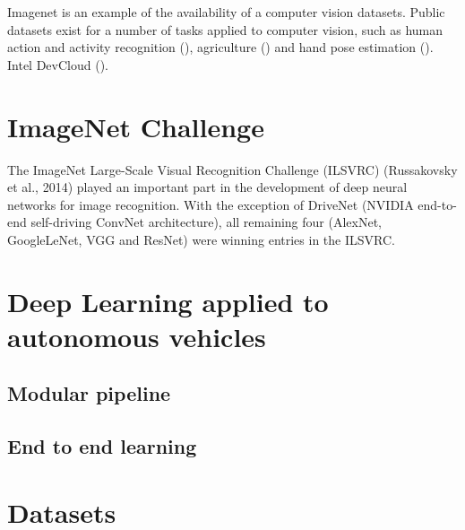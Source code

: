Imagenet is an example of the availability of a computer vision datasets. Public datasets exist for a number of tasks applied to computer vision, such as  
human action and activity recognition (\cite{chaquet2013survey}), agriculture (\cite{lu2020survey}) and hand pose estimation (\cite{li2019survey}).
Intel DevCloud (\cite{IntelDevCloud2020}).



\section{ImageNet Challenge}

The  ImageNet Large-Scale Visual Recognition Challenge (ILSVRC) (Russakovsky et al., 2014) played an important part in the development of deep neural networks for image recognition. With the exception of DriveNet (NVIDIA end-to-end self-driving ConvNet architecture), all remaining four (AlexNet, GoogleLeNet, VGG and ResNet) were winning entries in the ILSVRC.  



\section{Deep Learning applied to autonomous vehicles}

\subsection{Modular pipeline}

\subsection{End to end learning}



\lipsum[1]

\section{Datasets}

